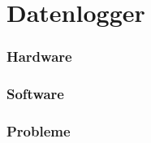 \section{Datenlogger}

\begin{frame}
	\frametitle{Hardware}
	
\end{frame}

\begin{frame}
	\frametitle{Software}
	
\end{frame}

\begin{frame}
	\frametitle{Probleme}
	
\end{frame}